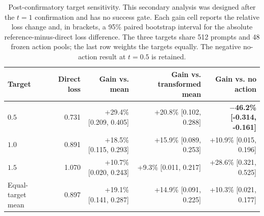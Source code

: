 \begin{table}[H]
\centering
\scriptsize
\setlength{\tabcolsep}{4pt}
\begin{tabular}{@{}lrrrr@{}}
\toprule
Target & Direct loss & Gain vs. mean & Gain vs. transformed mean & Gain vs. no action \\
\midrule
$0.5$ & 0.731 & +29.4\% [0.209, 0.405] & +20.8\% [0.102, 0.288] & \textbf{$-$46.2\% [-0.314, -0.161]} \\
$1.0$ & 0.891 & +18.5\% [0.115, 0.293] & +15.9\% [0.089, 0.253] & +10.9\% [0.015, 0.196] \\
$1.5$ & 1.070 & +10.7\% [0.020, 0.243] & +9.3\% [0.011, 0.217] & +28.6\% [0.321, 0.525] \\
Equal-target mean & 0.897 & +19.1\% [0.141, 0.287] & +14.9\% [0.091, 0.225] & +10.3\% [0.021, 0.177] \\
\bottomrule
\end{tabular}
\caption{Post-confirmatory target sensitivity. This secondary analysis was designed after the $t=1$ confirmation and has no success gate. Each gain cell reports the relative loss change and, in brackets, a 95\% paired bootstrap interval for the absolute reference-minus-direct loss difference. The three targets share 512 prompts and 48 frozen action pools; the last row weights the targets equally. The negative no-action result at $t=0.5$ is retained.}
\label{tab:phase8-ioi-sensitivity}
\end{table}
